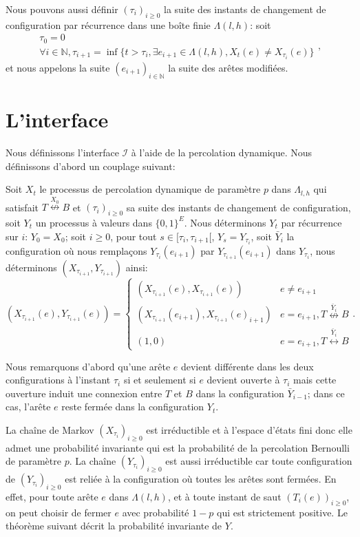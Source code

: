 \documentclass[titlepage,a4paper,12pt]{article}
\begin{document}
Nous pouvons aussi définir $(\tau_i)_{i\geqslant 0}$ la suite des instants de changement de configuration par récurrence dans une boîte finie $\Lambda(l,h)$: soit $$\left.
\begin{array}{l}
\tau_0 = 0 \\
\forall i\in \mathbb{N},\tau_{i+1} = \inf \{ t>\tau_i, \exists e_{i+1} \in \Lambda(l,h), X_t(e) \neq X_{\tau_i}(e)\}
\end{array}\right.,$$
et nous appelons la suite $(e_{i+1})_{i\in\mathbb{N}}$ la suite des arêtes modifiées.
\section{L'interface}
Nous définissons l'interface $\mathcal{I}$ à l'aide de la percolation dynamique. Nous définissons d'abord un couplage suivant:

Soit $X_t$ le processus de percolation dynamique de paramètre $p$ dans $\Lambda_{l,h}$ qui satisfait $T\overset{X_0}{\nleftrightarrow}B$ et $(\tau_i)_{i\geqslant 0}$ sa suite des instants de changement de configuration, soit $Y_t$ un processus à valeurs dans $\{0,1\}^E$. Nous déterminons $Y_t$ par récurrence sur $i$: $Y_0=X_0$; soit $i\geqslant 0$, pour tout $s\in [\tau_i, \tau_{i+1}[$, $Y_s = Y_{\tau_i}$, soit $\bar{Y}_i$ la configuration où nous remplaçons $Y_{\tau_i}(e_{i+1})$ par $Y_{\tau_{i+1}}(e_{i+1})$ dans $Y_{\tau_i}$, nous déterminons $(X_{\tau_{i+1}},Y_{\tau_{i+1}})$ ainsi:
$$(X_{\tau_{i+1}}(e),Y_{\tau_{i+1}}(e))=\left\lbrace \begin{array}{cc}
(X_{\tau_{i+1}}(e),X_{\tau_{i+1}}(e)) & e \neq e_{i+1}\\
(X_{\tau_{i+1}}(e_{i+1}),X_{\tau_{i+1}}(e)_{i+1}) & e = e_{i+1}, T \overset{\bar{Y}_i}{\nleftrightarrow} B \\
(1,0) & e = e_{i+1},T\overset{\bar{Y}_i}{\leftrightarrow} B 
\end{array}\right..$$

Nous remarquons d'abord qu'une arête $e$ devient différente dans les deux configurations à l'instant $\tau_i$ si et seulement si $e$ devient ouverte à $\tau_i$ mais cette ouverture induit une connexion entre $T$ et $B$ dans la configuration $\bar{Y}_{i-1}$; dans ce cas, l'arête $e$ reste fermée dans la configuration $Y_t$. 

La chaîne de Markov $(X_{\tau_i})_{i\geqslant 0}$ est irréductible et à l'espace d'états fini donc elle admet une probabilité invariante qui est la probabilité de la percolation Bernoulli de paramètre $p$. La chaîne $(Y_{\tau_i})_{i\geqslant 0}$ est aussi irréductible car toute configuration de $(Y_{\tau_i})_{i\geqslant 0}$ est reliée à la configuration où toutes les arêtes sont fermées. En effet, pour toute arête $e$ dans $\Lambda(l,h)$, et à toute instant de saut $(T_i(e))_{i\geqslant 0}$, on peut choisir de fermer $e$ avec probabilité $1-p$ qui est strictement positive. Le théorème suivant décrit la probabilité invariante de $Y$.
\end{document}

